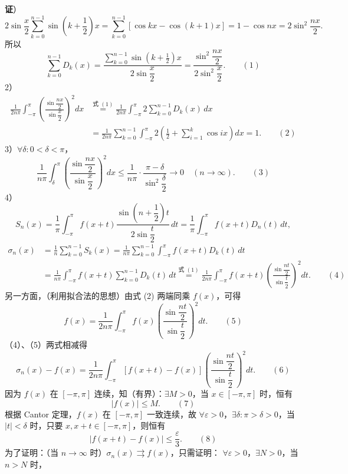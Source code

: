 \documentclass[UTF8, 12pt, fontset=fandol, oneside]{ctexart}
\providecommand{\xlongequal}[1]{\stackrel{#1}{=}}
\begin{document}
\noindent\textbf{证}）
\[
  2\sin\frac x2\sum_{k=0}^{n-1}\sin\left(k+\frac12\right)x
  =\sum_{k=0}^{n-1}[\cos kx-\cos(k+1)x]
  =1-\cos nx=2\sin^2\frac{nx}{2}.
\]
所以
\[
  \sum_{k=0}^{n-1}D_k(x)
  =\frac{\displaystyle\sum_{k=0}^{n-1}\sin\left(k+\frac12\right)x}{2\sin\dfrac x2}
  =\frac{\sin^2\dfrac{nx}{2}}{2\sin^2\dfrac x2}. \qquad(1)
\]
2）
\[
\begin{aligned}
\frac1{2n\pi}\int_{-\pi}^{\pi}
\left(\frac{\sin\dfrac{nx}{2}}{\sin\dfrac x2}\right)^2dx
&\xlongequal{\text{式 }(1)}
\frac1{2n\pi}\int_{-\pi}^{\pi}2\sum_{k=0}^{n-1}D_k(x)\,dx\\
&=\frac1{2n\pi}\sum_{k=0}^{n-1}\int_{-\pi}^{\pi}2\left(\frac12+\sum_{i=1}^{k}\cos ix\right)dx=1. \qquad(2)
\end{aligned}
\]
3）$\forall\delta:0<\delta<\pi$，
\[
  \frac1{n\pi}\int_{\delta}^{\pi}
  \left(\frac{\sin\dfrac{nx}{2}}{\sin\dfrac x2}\right)^2dx
  \le\frac1{n\pi}\cdot\frac{\pi-\delta}{\sin^2\dfrac{\delta}{2}}\to0
  \quad(n\to\infty). \qquad(3)
\]
4）
\[
  S_n(x)=\frac1\pi\int_{-\pi}^{\pi}f(x+t)
  \frac{\sin\left(n+\dfrac12\right)t}{2\sin\dfrac t2}\,dt
  =\frac1\pi\int_{-\pi}^{\pi}f(x+t)D_n(t)\,dt,
\]
\[
\begin{aligned}
\sigma_n(x)&=\frac1n\sum_{k=0}^{n-1}S_k(x)
=\frac1{n\pi}\sum_{k=0}^{n-1}\int_{-\pi}^{\pi}f(x+t)D_k(t)\,dt\\
&=\frac1{n\pi}\int_{-\pi}^{\pi}f(x+t)\sum_{k=0}^{n-1}D_k(t)\,dt
\xlongequal{\text{式 }(1)}
\frac1{2n\pi}\int_{-\pi}^{\pi}f(x+t)
\left(\frac{\sin\dfrac{nt}{2}}{\sin\dfrac t2}\right)^2dt. \qquad(4)
\end{aligned}
\]
另一方面，（利用拟合法的思想）由式 (2) 两端同乘 $f(x)$，可得
\[
  f(x)=\frac1{2n\pi}\int_{-\pi}^{\pi}f(x)
  \left(\frac{\sin\dfrac{nt}{2}}{\sin\dfrac t2}\right)^2dt. \qquad(5)
\]
（4）、（5）两式相减得
\[
  \sigma_n(x)-f(x)=\frac1{2n\pi}\int_{-\pi}^{\pi}
  [f(x+t)-f(x)]
  \left(\frac{\sin\dfrac{nt}{2}}{\sin\dfrac t2}\right)^2dt. \qquad(6)
\]
因为 $f(x)$ 在 $[-\pi,\pi]$ 连续，知（有界）：$\exists M>0$，当 $x\in[-\pi,\pi]$ 时，恒有
\[
  |f(x)|\le M. \qquad(7)
\]
根据 Cantor 定理，$f(x)$ 在 $[-\pi,\pi]$ 一致连续，故 $\forall\varepsilon>0$，$\exists\delta:\pi>\delta>0$，当
$|t|<\delta$ 时，只要 $x,x+t\in[-\pi,\pi]$，则恒有
\[
  |f(x+t)-f(x)|\le\frac{\varepsilon}{3}. \qquad(8)
\]
为了证明：（当 $n\to\infty$ 时）$\sigma_n(x)\rightrightarrows f(x)$，只需证明：
$\forall\varepsilon>0$，$\exists N>0$，当 $n>N$ 时，
\end{document}
